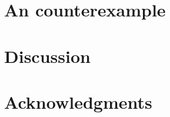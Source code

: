 \documentclass[preprint,12pt]{elsarticle}
\begin{document}
\section{An counterexample}

\section{Discussion}

\section*{Acknowledgments}




\end{document}
